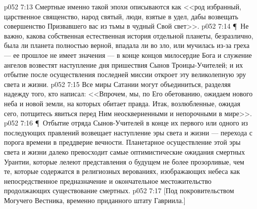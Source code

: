 \vs p052 7:13 Смертные именно такой эпохи описываются как <<род избранный, царственное священство, народ святый, люди, взятые в удел, дабы возвещать совершенство Призвавшего вас из тьмы в чудный Свой свет>>.
\vs p052 7:14 \P\ Не важно, какова собственная естественная история отдельной планеты, безразлично, была ли планета полностью верной, впадала ли во зло, или мучилась из\hyp{}за греха --- ее прошлое не имеет значения --- в конце концов милосердие Бога и служение ангелов возвестят наступление дня пришествия Сынов Троицы\hyp{}Учителей; и их отбытие после осуществления последней миссии откроет эту великолепную эру света и жизни.
\vs p052 7:15 Все миры Сатании могут объединиться, разделяя надежду того, кто написал: <<Впрочем, мы, по Его обетованию, ожидаем нового неба и новой земли, на которых обитает правда. Итак, возлюбленные, ожидая сего, потщитесь явиться перед Ним неоскверненными и непорочными в мире>>.
\vs p052 7:16 \P\ Отбытие отряда Сынов\hyp{}Учителей в конце их первого или одного из последующих правлений возвещает наступление эры света и жизни --- перехода с порога времени в преддверие вечности. Планетарное осуществление этой эры света и жизни далеко превосходит самые оптимистические ожидания смертных Урантии, которые лелеют представления о будущем не более прозорливые, чем те, которые содержатся в религиозных верованиях, изображающих небеса как непосредственное предназначение и окончательное местожительство продолжающих существование смертных.
\vs p052 7:17 [Под покровительством Могучего Вестника, временно приданного штату Гавриила.]
